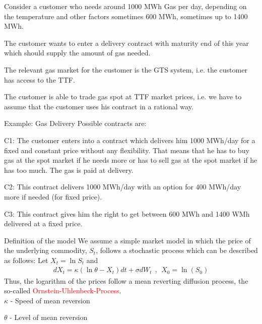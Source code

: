 



	Consider a customer who needs around 1000 MWh Gas per day, depending on the temperature and other factors sometimes 600 MWh, sometimes up to 1400 MWh.


	The customer wants to enter a delivery contract with maturity end of this year which should supply the amount of gas needed.


	The relevant gas market for the customer is the GTS system, i.e. the customer has access to the TTF.


	The customer is able to trade gas spot at TTF market prices, i.e. we have to assume that the customer uses his contract in a rational way.





{Example: Gas Delivery}
Possible contracts are:






	C1: The customer enters into a contract which delivers him 1000 MWh/day for a fixed and constant price without any flexibility. That means that he has to buy gas at the spot market if he needs more or has to sell gas at the spot market if he has too much. The gas is paid at delivery.


	C2: This contract delivers 1000 MWh/day with an option for 400 MWh/day more if needed (for fixed price).


	C3: This contract gives him the right to get between 600 MWh and 1400 WMh delivered at a fixed price.





{Definition of the model}
We assume a simple market model in which the price of the underlying commodity, $S_t$, follows a stochastic process which can be described as follows:
Let $X_t = \ln S_t$ and
\begin{align*}
	dX_t = \kappa (\ln \theta - X_t)dt + \sigma dW_t~~,~~X_0 = \ln(S_0)
\end{align*}
Thus, the logarithm of the prices follow a mean reverting diffusion process, the so-called \textcolor{red}{Ornstein-Uhlenbeck-Process}.\\






	$\kappa$ - Speed of mean reversion


	$\theta$ - Level of mean reversion


